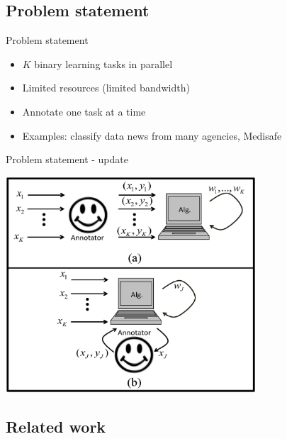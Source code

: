 \documentclass{beamer}
\begin{document}
\subsection{Problem statement}

\begin{frame}{Problem statement}
\begin{itemize}
\item $K$ binary learning tasks  in parallel\newline
\item Limited resources (limited bandwidth) \newline
\item Annotate one task at a time \newline

\item Examples: classify data news from many agencies, Medisafe\newline
\end{itemize}
\end{frame}


\begin{frame}{Problem statement - update}
\begin{center}
\includegraphics[width=0.7\textwidth]{figs/SHAMPO_illustration.eps}
\end{center}
\end{frame}

\subsection{Related work}
\end{document}
